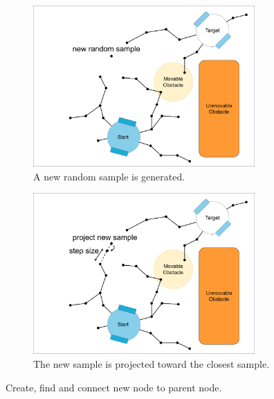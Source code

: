 \begin{figure}[H]
    \centering
    \begin{subfigure}{.49\textwidth}
    \centering
    \includegraphics[width=0.93\textwidth, cfbox=my_light_blue 5pt 0pt]{figures/required_background/mp/2mp_new_rand_sample.drawio.png}
    \caption{A new random sample is generated.\newline}
    \end{subfigure}
    \begin{subfigure}{.49\textwidth}
    \centering
    \includegraphics[width=0.93\textwidth, cfbox=my_light_blue 5pt 0pt]{figures/required_background/mp/3mp_project_sample.drawio.png}
    \caption{The new sample is projected toward the closest sample.\bs}%
    \label{subfig:mp_step_size}
    \end{subfigure}

    \caption{Create, find and connect new node to parent node.}
    \label{fig:motion_planner_adding_one_sample_one}
\end{figure}


